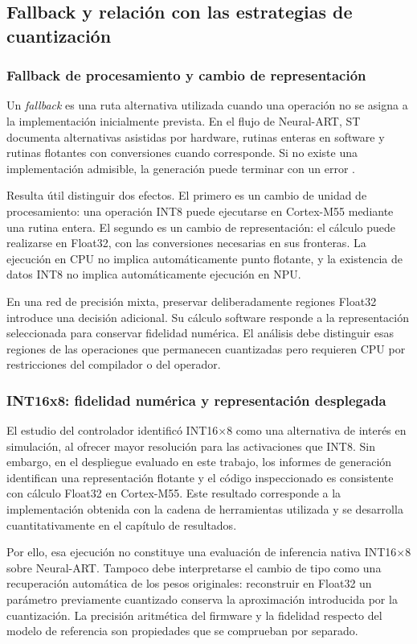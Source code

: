 \subsection{Fallback y relación con las estrategias de cuantización}\label{sec:cap4_fallback}
\subsubsection{Fallback de procesamiento y cambio de representación}
Un \emph{fallback} es una ruta alternativa utilizada cuando una operación no se asigna a la implementación inicialmente prevista. En el flujo de Neural-ART, ST documenta alternativas asistidas por hardware, rutinas enteras en software y rutinas flotantes con conversiones cuando corresponde. Si no existe una implementación admisible, la generación puede terminar con un error \cite{cap4_stconcepts}.

Resulta útil distinguir dos efectos. El primero es un cambio de unidad de procesamiento: una operación INT8 puede ejecutarse en Cortex-M55 mediante una rutina entera. El segundo es un cambio de representación: el cálculo puede realizarse en Float32, con las conversiones necesarias en sus fronteras. La ejecución en CPU no implica automáticamente punto flotante, y la existencia de datos INT8 no implica automáticamente ejecución en NPU.

En una red de precisión mixta, preservar deliberadamente regiones Float32 introduce una decisión adicional. Su cálculo software responde a la representación seleccionada para conservar fidelidad numérica. El análisis debe distinguir esas regiones de las operaciones que permanecen cuantizadas pero requieren CPU por restricciones del compilador o del operador.

\subsubsection{INT16x8: fidelidad numérica y representación desplegada}
El estudio del controlador identificó INT16$\times$8 como una alternativa de interés en simulación, al ofrecer mayor resolución para las activaciones que INT8. Sin embargo, en el despliegue evaluado en este trabajo, los informes de generación identifican una representación flotante y el código inspeccionado es consistente con cálculo Float32 en Cortex-M55. Este resultado corresponde a la implementación obtenida con la cadena de herramientas utilizada y se desarrolla cuantitativamente en el capítulo de resultados.

Por ello, esa ejecución no constituye una evaluación de inferencia nativa INT16$\times$8 sobre Neural-ART. Tampoco debe interpretarse el cambio de tipo como una recuperación automática de los pesos originales: reconstruir en Float32 un parámetro previamente cuantizado conserva la aproximación introducida por la cuantización. La precisión aritmética del firmware y la fidelidad respecto del modelo de referencia son propiedades que se comprueban por separado.

